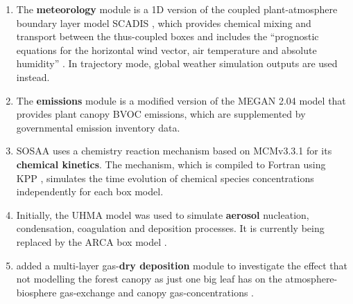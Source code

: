 \begin{multicols}{2}
    \begin{enumerate}
        \item The \textbf{meteorology} module is a 1D version of the coupled plant-atmosphere boundary layer model SCADIS \cite{scandis-model-2002, scandis-analysis-2005, scandis-drag-2006}, which provides chemical mixing and transport between the thus-coupled boxes \cite{sosa-description-2011} and includes the ``prognostic equations for the horizontal wind vector, air temperature and absolute humidity'' \cite{sosaa-trends-2021}. In trajectory mode, global weather simulation outputs are used instead.
        \item The \textbf{emissions} module is a modified version of the MEGAN 2.04 \cite{megan-model-2006} model that provides plant canopy BVOC emissions, which are supplemented by governmental emission inventory data.
        \item SOSAA uses a chemistry reaction mechanism based on MCMv3.3.1 \cite{mcm-protocol-1997, mcm-v3-2003, mcm-beta-2012} for its \textbf{chemical kinetics}. The mechanism, which is compiled to Fortran using KPP \cite{kpp-preprocessor-2002}, simulates the time evolution of chemical species concentrations independently for each box model.
        \item Initially, the UHMA \cite{uhma-model-2004} model was used to simulate \textbf{aerosol} nucleation, condensation, coagulation and deposition processes. It is currently being replaced by the ARCA box model \cite{arca-box-2022}.
        \item \textcite{sosaa-bvoc-2017} added a multi-layer gas-\textbf{dry deposition} module \cite{gas-exchange-2002} to investigate the effect that not modelling the forest canopy as just one big leaf has on the atmosphere-biosphere gas-exchange and canopy gas-concentrations \cite{sosaa-bvoc-2017, sosaa-ozone-2017}.
    \end{enumerate}
\end{multicols}

